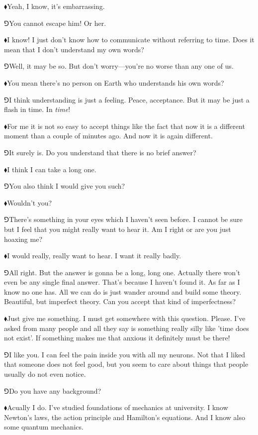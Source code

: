 \documentclass[10pt,oneside%
]{memoir}
\newcommand{\hea}{\(\blacklozenge\)\;}
\newcommand{\heb}{\(\Game\)\;}
\begin{document}
\hea Yeah, I know, it's embarrassing.

\heb You cannot escape him! Or her.

\hea I know! I just don't know how to communicate without referring to time. Does it mean that I don't understand my own words?

\heb Well, it may be so. But don't worry---you're no worse than any one of us.

\hea You mean there's no person on Earth who understands his own words?

\heb I think understanding is just a feeling. Peace, acceptance. But it may be just a flash in time. In \emph{time}!

\hea For me it is not so easy to accept things like the fact that now it is a different moment than a couple of minutes ago. And now it is again different.

\heb It surely is. Do you understand that there is no brief answer?

\hea I think I can take a long one.

\heb You also think I would give you such?

\hea Wouldn't you?

\heb There's something in your eyes which I haven't seen before. I cannot be sure but I feel that you might really want to hear it. Am I right or are you just hoaxing me?

\hea I would really, really want to hear. I want it really badly.

\heb All right. But the answer is gonna be a long, long one. Actually there won't even be any single final answer. That's because I haven't found it. As far as I know no one has. All we can do is just wander around and build some theory. Beautiful, but imperfect theory. Can you accept that kind of imperfectness?

\hea Just give me something. I must get somewhere with this question. Please. I've asked from many people and all they say is something really silly like 'time does not exist'. If something makes me that anxious it definitely must be there!

\heb I like you. I can feel the pain inside you with all my neurons. Not that I liked that someone does not feel good, but you seem to care about things that people usually do not even notice.

\heb Do you have any background?

\hea Acually I do. I've studied foundations of mechanics at university. I know Newton's laws, the action principle and Hamilton's equations. And I know also some quantum mechanics.
\end{document}
